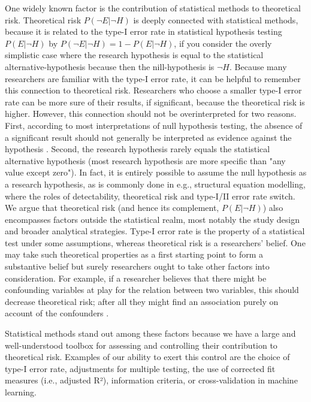 \documentclass[jou,a4paper]{apa7}
\begin{document}
One widely known factor is the contribution of statistical methods to theoretical risk.
Theoretical risk $P(\neg{}E|\neg{}H)$ is deeply connected with statistical methods, because it is related to the type-I error rate in statistical hypothesis testing $P(E|\neg{}H)$ by $P(\neg{}E|\neg{}H) = 1 - P(E|\neg{}H)$, if you consider the overly simplistic case where the research hypothesis is equal to the statistical alternative-hypothesis because then the nill-hypothesis is $\neg{}H$.
Because many researchers are familiar with the type-I error rate, it can be helpful to remember this connection to theoretical risk.
Researchers who choose a smaller type-I error rate can be more sure of their results, if significant, because the theoretical risk is higher.
However, this connection should not be overinterpreted for two reasons.
First, according to most interpretations of null hypothesis testing, the absence of a significant result should not generally be interpreted as evidence against the hypothesis \parencite[][, 5.3]{mayoStatisticalInferenceSevere2018}.
Second, the research hypothesis rarely equals the statistical alternative hypothesis (most research hypothesis are more specific than "any value except zero").
In fact, it is entirely possible to assume the null hypothesis as a research hypothesis, as is commonly done in e.g., structural equation modelling, where the roles of detectability, theoretical risk and type-I/II error rate switch.
We argue that theoretical risk (and hence its complement, $P(E|\neg{}H)$) also encompasses factors outside the statistical realm, most notably the study design and broader analytical strategies.
Type-I error rate is the property of a statistical test under some assumptions, whereas theoretical risk is a researchers' belief.
One may take such theoretical properties as a first starting point to form a substantive belief but surely researchers ought to take other factors into consideration.
For example, if a researcher believes that there might be confounding variables at play for the relation between two variables, this should decrease theoretical risk; after all they might find an association purely on account of the confounders \parencite{fiedlerWhatConstitutesStrong2017}.\par
Statistical methods stand out among these factors because we have a large and well-understood toolbox for assessing and controlling their contribution to theoretical risk.
Examples of our ability to exert this control are the choice of type-I error rate, adjustments for multiple testing, the use of corrected fit measures (i.e., adjusted R²), information criteria, or cross-validation in machine learning.
\end{document}
